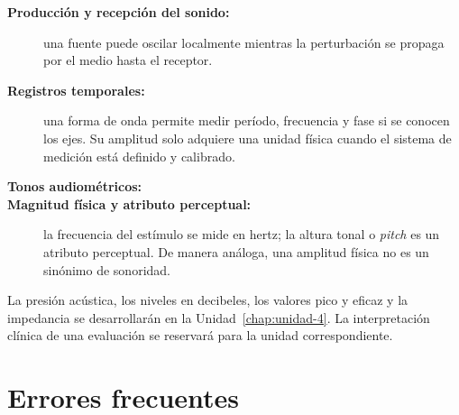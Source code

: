 \begin{description}
    \item[\textbf{Producción y recepción del sonido:}]
    una fuente puede oscilar localmente mientras la perturbación se propaga
    por el medio hasta el receptor.
    \item[\textbf{Registros temporales:}]
    una forma de onda permite medir período, frecuencia y fase si se conocen
    los ejes. Su amplitud solo adquiere una unidad física cuando el sistema de
    medición está definido y calibrado.
    \item[\textbf{Tonos audiométricos:}]
    \item[\textbf{Magnitud física y atributo perceptual:}]
    la frecuencia del estímulo se mide en hertz; la altura tonal o
    \emph{pitch} es un atributo perceptual. De manera análoga, una amplitud
    física no es un sinónimo de sonoridad.
\end{description}

La presión acústica, los niveles en decibeles, los valores pico y eficaz y la
impedancia se desarrollarán en la Unidad~\ref{chap:unidad-4}. La
interpretación clínica de una evaluación se reservará para la unidad
correspondiente.

\section{Errores frecuentes}
\label{sec:u3-errores}

